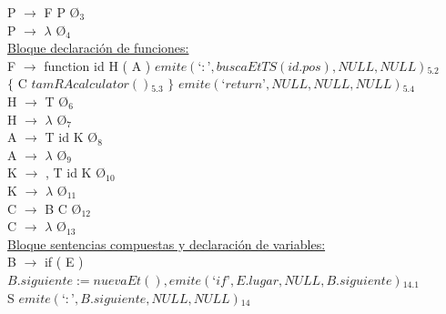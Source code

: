 \documentclass{article}[a4paper]
\newcommand\tab[1][1cm]{\hspace*{#1}}
\begin{document}
\tab P $\rightarrow$ F P \textcolor{OliveGreen}{$ $\lbrace$Ø$\rbrace$_{3}$}\\

\tab P $\rightarrow$ $\lambda$ \textcolor{OliveGreen}{$ $\lbrace$Ø$\rbrace$_{4}$}\\ 

\noindent\underline{Bloque declaración de funciones:}\\

\tab F $\rightarrow$ function id 
H ( A ) \textcolor{OliveGreen}{$ $\lbrace$emite(‘:’, buscaEtTS(id.pos), NULL, NULL)$\rbrace$_{5.2}$} \\ \tab \tab
$\lbrace$ C  \textcolor{OliveGreen}{$ $\lbrace$tamRAcalculator()$\rbrace$_{5.3}$} $\rbrace$ \textcolor{OliveGreen}{$ $\lbrace$emite(‘return’, NULL, NULL, NULL)$\rbrace$_{5.4}$}\\

\tab H $\rightarrow$ T \textcolor{OliveGreen}{$ $\lbrace$Ø$\rbrace$_{6}$}\\

\tab H $\rightarrow$ $\lambda$ \textcolor{OliveGreen}{$ $\lbrace$Ø$\rbrace$_{7}$}\\

\tab A $\rightarrow$ T id K \textcolor{OliveGreen}{$ $\lbrace$Ø$\rbrace$_{8}$}\\

\tab A $\rightarrow$ $\lambda$ \textcolor{OliveGreen}{$ $\lbrace$Ø$\rbrace$_{9}$}\\

\tab K $\rightarrow$ , T id K \textcolor{OliveGreen}{$ $\lbrace$Ø$\rbrace$_{10}$}\\

\tab K $\rightarrow$ $\lambda$ \textcolor{OliveGreen}{$ $\lbrace$Ø$\rbrace$_{11}$}\\

\tab C $\rightarrow$ B C \textcolor{OliveGreen}{$ $\lbrace$Ø$\rbrace$_{12}$}\\

\tab C $\rightarrow$ $\lambda$ \textcolor{OliveGreen}{$ $\lbrace$Ø$\rbrace$_{13}$}\\

\noindent\underline{Bloque sentencias compuestas y declaración de variables:}\\

\tab B $\rightarrow$ if ( E ) \textcolor{OliveGreen}{$ $\lbrace$B.siguiente := nuevaEt(), emite(‘if’, E.lugar, NULL, B.siguiente)$\rbrace$_{14.1}$}\\
\tab \tab \tab S \textcolor{OliveGreen}{$ $\lbrace$emite(‘:’, B.siguiente, NULL, NULL)$\rbrace$_{14}$}\\
\end{document}
